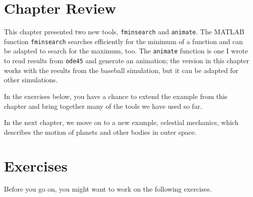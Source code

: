 \section{Chapter Review}

This chapter presented two new tools, \lstinline{fminsearch} and \lstinline{animate}.
The MATLAB function \lstinline{fminsearch} searches efficiently for the minimum of a function and can be adapted to search for the maximum, too.
The \lstinline{animate} function is one I wrote to read results from \lstinline{ode45} and generate an animation; the version in this chapter works with the results from the baseball simulation, but it can be adapted for other simulations.

In the exercises below, you have a chance to extend the example from this chapter and bring together many of the tools we have used so far.

In the next chapter, we move on to a new example, celestial mechanics, which describes the motion of planets and other bodies in outer space.


\section{Exercises}

Before you go on, you might want to work on the following exercises.


